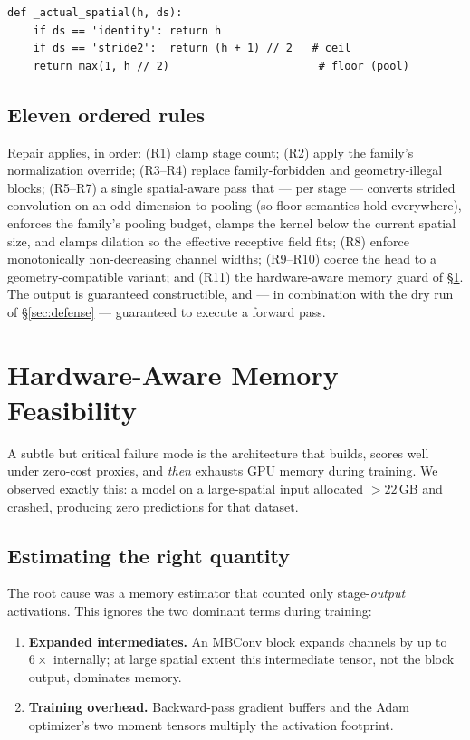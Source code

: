 \documentclass[10pt,twocolumn]{article}
\begin{document}
\begin{lstlisting}
def _actual_spatial(h, ds):
    if ds == 'identity': return h
    if ds == 'stride2':  return (h + 1) // 2   # ceil
    return max(1, h // 2)                       # floor (pool)
\end{lstlisting}

\subsection{Eleven ordered rules}
Repair applies, in order: (R1) clamp stage count; (R2) apply the family's
normalization override; (R3--R4) replace family-forbidden and
geometry-illegal blocks; (R5--R7) a single spatial-aware pass that --- per
stage --- converts strided convolution on an odd dimension to pooling (so
floor semantics hold everywhere), enforces the family's pooling budget, clamps
the kernel below the current spatial size, and clamps dilation so the effective
receptive field fits; (R8) enforce monotonically non-decreasing channel widths;
(R9--R10) coerce the head to a geometry-compatible variant; and (R11) the
hardware-aware memory guard of \S\ref{sec:memory}. The output is guaranteed
constructible, and --- in combination with the dry run of
\S\ref{sec:defense} --- guaranteed to execute a forward pass.

\section{Hardware-Aware Memory Feasibility}
\label{sec:memory}

A subtle but critical failure mode is the architecture that builds, scores
well under zero-cost proxies, and \emph{then} exhausts GPU memory during
training. We observed exactly this: a model on a large-spatial input allocated
$>22$\,GB and crashed, producing zero predictions for that dataset.

\subsection{Estimating the right quantity}
The root cause was a memory estimator that counted only stage-\emph{output}
activations. This ignores the two dominant terms during training:

\begin{enumerate}\itemsep2pt
\item \textbf{Expanded intermediates.} An MBConv block expands channels by up
  to $6\times$ internally; at large spatial extent this intermediate tensor,
  not the block output, dominates memory.
\item \textbf{Training overhead.} Backward-pass gradient buffers and the
  Adam optimizer's two moment tensors multiply the activation footprint.
\end{enumerate}
\end{document}
